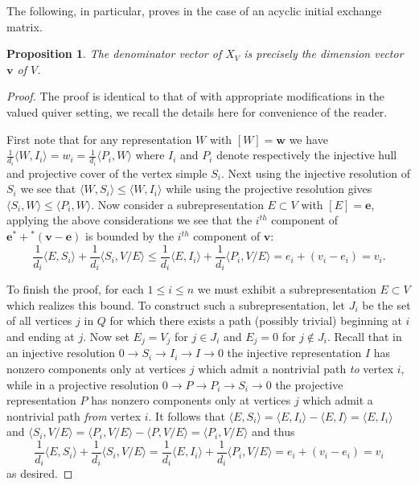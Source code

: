 \documentclass{amsart}
\newtheorem{proposition}[theorem]{Proposition}
\newcommand{\bfe}{\mathbf{e}}
\newcommand{\bfv}{\mathbf{v}}
\newcommand{\bfw}{\mathbf{w}}
\begin{document}
  The following, in particular, proves \cite[Conj. 1.9]{reading-stella} in the case of an acyclic initial exchange matrix.
  \begin{proposition}
    \label{prop:denominators}
    The denominator vector of $X_V$ is precisely the dimension vector $\bfv$ of $V$.
  \end{proposition}
  \begin{proof}
    The proof is identical to that of \cite[Sec. 4, Cor. 2]{caldero-keller} with appropriate modifications in the valued quiver setting, we recall the details here for convenience of the reader.  

    First note that for any representation $W$ with $[W]=\bfw$ we have $\frac{1}{d_i}\langle W,I_i\rangle=w_i=\frac{1}{d_i}\langle P_i,W\rangle$ where $I_i$ and $P_i$ denote respectively the injective hull and projective cover of the vertex simple $S_i$.  Next using the injective resolution of $S_i$ we see that $\langle W,S_i\rangle\le\langle W,I_i\rangle$ while using the projective resolution gives $\langle S_i,W\rangle\le\langle P_i,W\rangle$.  Now consider a subrepresentation $E\subset V$ with $[E]=\bfe$, applying the above considerations we see that the $i^{th}$ component of $\bfe^*+{}^*(\bfv-\bfe)$ is bounded by the $i^{th}$ component of $\bfv$:
    \[\frac{1}{d_i}\langle E,S_i\rangle+\frac{1}{d_i}\langle S_i,V/E\rangle\le\frac{1}{d_i}\langle E,I_i\rangle+\frac{1}{d_i}\langle P_i,V/E\rangle=e_i+(v_i-e_i)=v_i.\]

    To finish the proof, for each $1\le i\le n$ we must exhibit a subrepresentation $E\subset V$ which realizes this bound.  
    To construct such a subrepresentation, let $J_i$ be the set of all vertices $j$ in $Q$ for which there exists a path (possibly trivial) beginning at $i$ and ending at $j$.  
    Now set $E_j=V_j$ for $j\in J_i$ and $E_j=0$ for $j\notin J_i$.  
    Recall that in an injective resolution $0\longrightarrow S_i\longrightarrow I_i\longrightarrow I\longrightarrow 0$ the injective representation $I$ has nonzero components only at vertices $j$ which admit a nontrivial path \emph{to} vertex $i$, while in a projective resolution $0\longrightarrow P\longrightarrow P_i\longrightarrow S_i\longrightarrow 0$ the projective representation $P$ has nonzero components only at vertices $j$ which admit a nontrivial path \emph{from} vertex $i$.  
    It follows that $\langle E,S_i\rangle=\langle E,I_i\rangle-\langle E,I\rangle=\langle E,I_i\rangle$ and $\langle S_i,V/E\rangle=\langle P_i,V/E\rangle-\langle P,V/E\rangle=\langle P_i,V/E\rangle$ and thus 
    \[\frac{1}{d_i}\langle E,S_i\rangle+\frac{1}{d_i}\langle S_i,V/E\rangle=\frac{1}{d_i}\langle E,I_i\rangle+\frac{1}{d_i}\langle P_i,V/E\rangle=e_i+(v_i-e_i)=v_i\]
    as desired.
  \end{proof}
\end{document}
